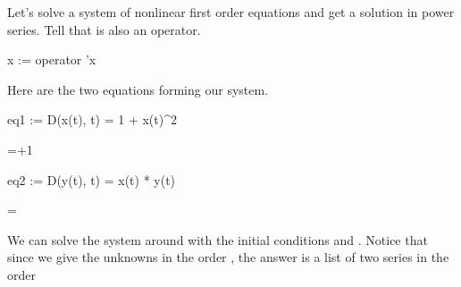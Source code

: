 {{{{{{{{\begin{xtc}
\begin{xtccomment}
Let's solve a system of nonlinear first order equations and get a
solution in power series.
Tell \Language{} that  is also an operator.
\end{xtccomment}
\begin{spadsrc}
x := operator 'x
\end{spadsrc}
\begin{TeXOutput}
\begin{fricasmath}{10}
%
\end{fricasmath}
\end{TeXOutput}
\end{xtc}
\begin{xtc}
\begin{xtccomment}
Here are the two equations forming our system.
\end{xtccomment}
\begin{spadsrc}
eq1 := D(x(t), t) = 1 + x(t)^2
\end{spadsrc}
\begin{TeXOutput}
\begin{fricasmath}{11}
=+1%
\end{fricasmath}
\end{TeXOutput}
\end{xtc}
\begin{xtc}
\begin{xtccomment}
\end{xtccomment}
\begin{spadsrc}
eq2 := D(y(t), t) = x(t) * y(t)
\end{spadsrc}
\begin{TeXOutput}
\begin{fricasmath}{12}
=%
\TIMES {}%
\end{fricasmath}
\end{TeXOutput}
\end{xtc}
\begin{xtc}
\begin{xtccomment}
We can solve the system around  with the initial conditions
 and .
Notice that since we give the unknowns in the
order \spad{[x, y]}, the answer is a list of two series in the order

\end{xtccomment}
\end{xtc}}}}}}}}}
